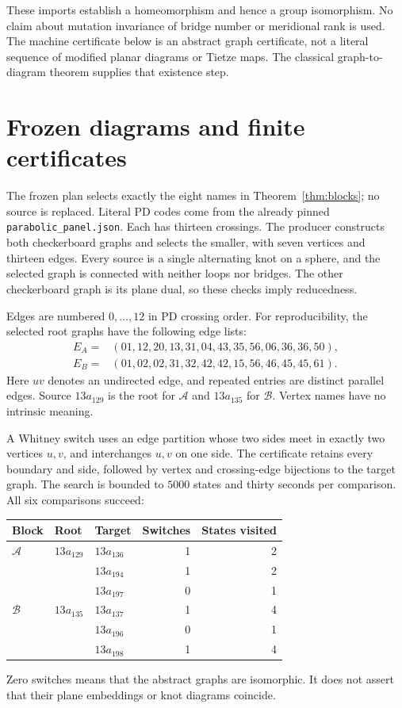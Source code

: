 \documentclass[11pt]{article}
\begin{document}
These imports establish a homeomorphism and hence a group isomorphism.
No claim about mutation invariance of bridge number or meridional rank
is used. The machine certificate below is an abstract graph certificate,
not a literal sequence of modified planar diagrams or Tietze maps.
The classical graph-to-diagram theorem supplies that existence step.

\section{Frozen diagrams and finite certificates}

The frozen plan selects exactly the eight names in
Theorem~\ref{thm:blocks}; no source is replaced. Literal PD codes come
from the already pinned \texttt{parabolic\_panel.json}. Each has thirteen
crossings. The producer constructs both checkerboard graphs and selects
the smaller, with seven vertices and thirteen edges. Every source is a
single alternating knot on a sphere, and the selected graph is connected
with neither loops nor bridges. The other checkerboard graph is its
plane dual, so these checks imply reducedness.

Edges are numbered $0,\ldots,12$ in PD crossing order. For reproducibility,
the selected root graphs have the following edge lists:
\begin{align*}
 E_A={}&(01,12,20,13,31,04,43,35,56,06,36,36,50),\\
 E_B={}&(01,02,02,31,32,42,42,15,56,46,45,45,61).
\end{align*}
Here $uv$ denotes an undirected edge, and repeated entries are distinct
parallel edges. Source $13a_{129}$ is the root for $\mathcal A$ and
$13a_{135}$ for $\mathcal B$. Vertex names have no intrinsic meaning.

A Whitney switch uses an edge partition whose two sides meet in exactly
two vertices $u,v$, and interchanges $u,v$ on one side. The certificate
retains every boundary and side, followed by vertex and crossing-edge
bijections to the target graph. The search is bounded to $5000$ states
and thirty seconds per comparison. All six comparisons succeed:
\begin{center}
\begin{tabular}{lllrr}
\toprule
Block & Root & Target & Switches & States visited\\
\midrule
$\mathcal A$ & $13a_{129}$ & $13a_{136}$ &1&2\\
 & & $13a_{194}$ &1&2\\
 & & $13a_{197}$ &0&1\\
$\mathcal B$ & $13a_{135}$ & $13a_{137}$ &1&4\\
 & & $13a_{196}$ &0&1\\
 & & $13a_{198}$ &1&4\\
\bottomrule
\end{tabular}
\end{center}
Zero switches means that the abstract graphs are isomorphic. It does
not assert that their plane embeddings or knot diagrams coincide.
\end{document}

